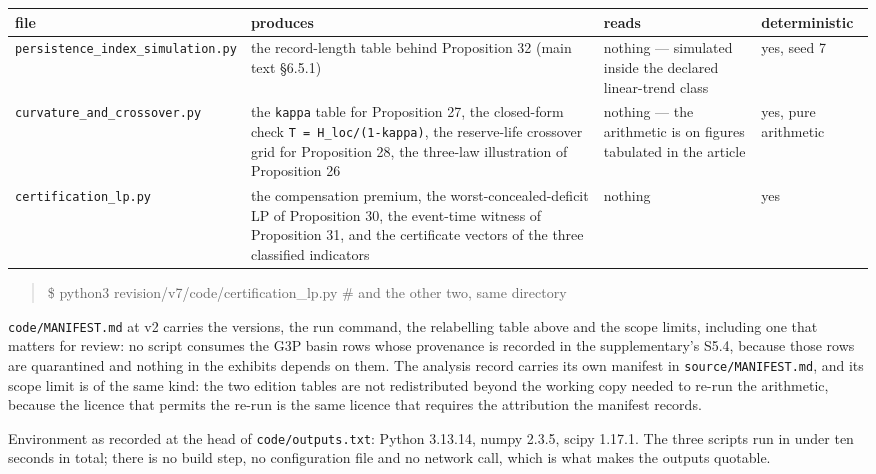 \documentclass[11pt]{article}
\begin{document}
\begin{longtable}{@{}l|p{50mm}|p{50mm}|l@{}}
\toprule
file & produces & reads & deterministic \\
\midrule
\texttt{persistence\_index\_simulation.py} & the record-length table behind Proposition 32 (main text \S6.5.1) & nothing --- simulated inside the declared linear-trend class & yes, seed 7 \\
\texttt{curvature\_and\_crossover.py} & the \texttt{kappa} table for Proposition 27, the closed-form check \texttt{T = H\_loc/(1-kappa)}, the reserve-life crossover grid for Proposition 28, the three-law illustration of Proposition 26 & nothing --- the arithmetic is on figures tabulated in the article & yes, pure arithmetic \\
\texttt{certification\_lp.py} & the compensation premium, the worst-concealed-deficit LP of Proposition 30, the event-time witness of Proposition 31, and the certificate vectors of the three classified indicators & nothing & yes \\
\bottomrule
\end{longtable}

\begin{quote}\ttfamily\footnotesize\raggedright\setlength{\parskip}{0pt}
\$ python3 revision/v7/code/certification\_lp.py            \# and the other two, same directory
\end{quote}

\texttt{code/MANIFEST.md} at v2 carries the versions, the run command, the relabelling table above and the scope limits, including one that matters for review: no script consumes the G3P basin rows whose provenance is recorded in the supplementary's S5.4, because those rows are quarantined and nothing in the exhibits depends on them. The analysis record carries its own manifest in \texttt{source/MANIFEST.md}, and its scope limit is of the same kind: the two edition tables are not redistributed beyond the working copy needed to re-run the arithmetic, because the licence that permits the re-run is the same licence that requires the attribution the manifest records.

Environment as recorded at the head of \texttt{code/outputs.txt}: Python 3.13.14, numpy 2.3.5, scipy 1.17.1. The three scripts run in under ten seconds in total; there is no build step, no configuration file and no network call, which is what makes the outputs quotable.
\end{document}
